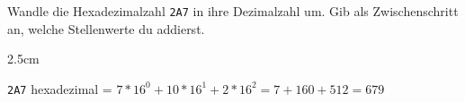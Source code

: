 \question[2]
Wandle die Hexadezimalzahl \texttt{2A7} in ihre Dezimalzahl um.
Gib als Zwischenschritt an, welche Stellenwerte du addierst.

\begin{solutionbox}{2.5cm}

\texttt{2A7} hexadezimal = $7*16^0 + 10*16^1 + 2*16^2 = 7 + 160 + 512 = 679$

\end{solutionbox}